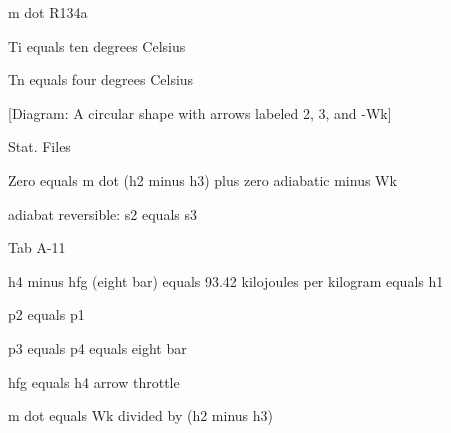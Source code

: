 m dot R134a

Ti equals ten degrees Celsius

Tn equals four degrees Celsius

[Diagram: A circular shape with arrows labeled 2, 3, and -Wk]

Stat. Files

Zero equals m dot (h2 minus h3) plus zero adiabatic minus Wk

adiabat reversible: s2 equals s3

Tab A-11

h4 minus hfg (eight bar) equals 93.42 kilojoules per kilogram equals h1

p2 equals p1

p3 equals p4 equals eight bar

hfg equals h4 arrow throttle

m dot equals Wk divided by (h2 minus h3)